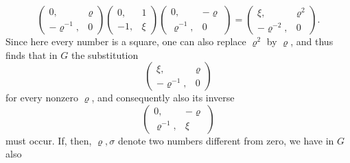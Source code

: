 \[
\begin{pmatrix} 0, & \varrho \\ -\varrho^{-1}, & 0 \end{pmatrix}\begin{pmatrix} 0, & 1 \\ -1, & \xi \end{pmatrix}\begin{pmatrix} 0, & -\varrho \\ \varrho^{-1}, & 0 \end{pmatrix} = \begin{pmatrix} \xi, & \varrho^2 \\ -\varrho^{-2}, & 0 \end{pmatrix}.
\]
Since here every number is a square, one can also replace $\varrho^2$ by $\varrho$, and thus finds that in $G$ the substitution
\[
\begin{pmatrix} \xi, & \varrho \\ -\varrho^{-1}, & 0 \end{pmatrix}
\]
for every nonzero $\varrho$, and consequently also its inverse
\[
\begin{pmatrix} 0, & -\varrho \\ \varrho^{-1}, & \xi \end{pmatrix}
\]
must occur. If, then, $\varrho,\sigma$ denote two numbers different from zero, we have in $G$ also
